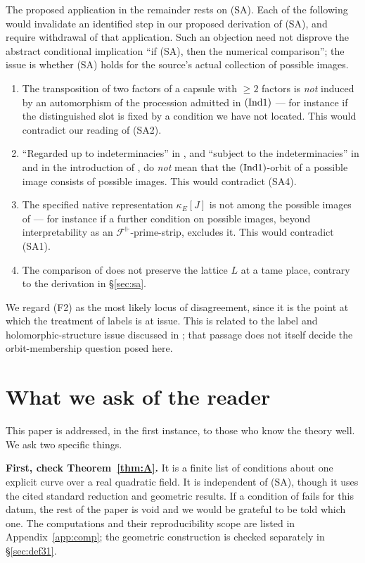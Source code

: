 \documentclass[11pt]{article}
\theoremstyle{plain}
\theoremstyle{definition}
\newcommand{\Ind}[1]{\textup{(Ind#1)}}
\newcommand{\SA}{\textup{(SA)}}
\begin{document}
The proposed application in the remainder rests on \SA{}.  Each of the
following would invalidate an identified step in our proposed derivation of
\SA{}, and require withdrawal of that application.  Such an objection need
not disprove the abstract conditional implication ``if \SA{}, then the
numerical comparison''; the issue is whether \SA{} holds for the source's
actual collection of possible images.
\begin{enumerate}[label=(F\arabic*)]
\item The transposition of two factors of a capsule with $\ge2$ factors is
  \emph{not} induced by an automorphism of the procession admitted in
  $\Ind1$ --- for instance if the distinguished slot is fixed by a condition we
  have not located.  This would contradict our reading of (SA2).
\item ``Regarded up to indeterminacies'' in \cite[Theorem 3.11(i)]{IUT3}, and
  ``subject to the indeterminacies'' in \cite[Corollary 3.12]{IUT3} and in the
  introduction of \cite{IUT3}, do \emph{not} mean that the $\Ind1$-orbit of a
  possible image consists of possible images.  This would contradict (SA4).
\item The specified native representation $\kappa_E[J]$ is not among the possible
  images of \cite[Corollary 3.12]{IUT3} --- for instance if a further condition
  on possible images, beyond interpretability as an
  $\mathcal{F}^\Vdash$-prime-strip, excludes it.  This would contradict (SA1).
\item The comparison of \cite[Theorem 3.11(ii)(a)]{IUT3} does not preserve the
  lattice $L$ at a tame place, contrary to the derivation in \S\ref{sec:sa}.
\end{enumerate}
We regard (F2) as the most likely locus of disagreement, since it is the point at
which the treatment of labels is at issue.  This is related to the label and
holomorphic-structure issue discussed in \cite[\S12]{Rpt2018}; that passage
does not itself decide the orbit-membership question posed here.

\section{What we ask of the reader}\label{sec:ask}

This paper is addressed, in the first instance, to those who know the theory
well.  We ask two specific things.

\medskip\noindent\textbf{First, check Theorem~\ref{thm:A}.}
It is a finite list of conditions about one explicit curve over a real quadratic
field.  It is independent of \SA{}, though it uses the cited standard reduction and
geometric results.  If a
condition of \cite[Definition 3.1]{IUT1} fails for this datum, the rest of the
paper is void and we would be grateful to be told which one.  The computations
and their reproducibility scope are listed in Appendix~\ref{app:comp}; the
geometric construction is checked separately in \S\ref{sec:def31}.
\end{document}

